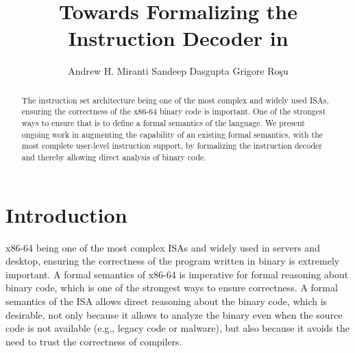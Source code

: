 \documentclass[a4paper,UKenglish,cleveref, autoref]{lipics-v2019}
\title{Towards Formalizing the \ISA Instruction Decoder in \K} %
\author{Andrew H. Miranti \qquad Sandeep Dasgupta \qquad Grigore Ro\c{s}u}{\hspace{3.5cm}University of Illinois at Urbana Champaign, USA}{\qquad\qquad\quad\qquad\qquad\qquad\qquad\{miranti2, sdasgup3, grosu\}@illinois.edu}{}{}
\begin{document}
\maketitle

\begin{abstract}
    The \ISA instruction set architecture being one of the
    most complex and widely used ISAs,  ensuring the correctness of the x86-64 binary code is
    important. One of the strongest ways to ensure that is to define a  formal semantics of the \ISA language. We present ongoing work in augmenting the capability of an existing \ISA formal semantics, with the most complete user-level instruction support, by formalizing the instruction decoder and thereby allowing direct analysis of binary code.
\end{abstract}

\section{Introduction}
\label{sec:intro}
x86-64 being one of the most complex ISAs and widely used in servers and
desktop, ensuring the correctness of the program written in binary is extremely
important. A formal semantics of x86-64 is imperative for formal reasoning
about binary code, which is  one of the strongest ways to ensure
correctness. A formal semantics of the ISA allows direct reasoning about the
binary code, which is desirable, not only because it allows to analyze the
binary even when the source code is not available (e.g., legacy code or
    malware), but also because it avoids the need to trust the correctness of
compilers.

%
\end{document}
